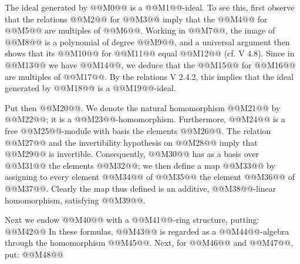 The ideal generated by @@M0@@ is a @@M1@@-ideal. To see this, first observe that the relations @@M2@@ for @@M3@@ imply that the @@M4@@ for @@M5@@ are multiples of @@M6@@. Working in @@M7@@, the image of @@M8@@ is a polynomial of degree @@M9@@, and a universal argument then shows that its @@M10@@ for @@M11@@ equal @@M12@@ (cf. V 4.8). Since in @@M13@@ we have @@M14@@, we deduce that the @@M15@@ for @@M16@@ are multiples of @@M17@@. By the relations V 2.4.2, this implies that the ideal generated by @@M18@@ is a @@M19@@-ideal.

Put then @@M20@@. We denote the natural homomorphism @@M21@@ by @@M22@@; it is a @@M23@@-homomorphism. Furthermore, @@M24@@ is a free @@M25@@-module with basis the elements @@M26@@. The relation @@M27@@ and the invertibility hypothesis on @@M28@@ imply that @@M29@@ is invertible. Consequently, @@M30@@ has as a basis over @@M31@@ the elements @@M32@@; we then define a map @@M33@@ by assigning to every element @@M34@@ of @@M35@@ the element @@M36@@ of @@M37@@. Clearly the map thus defined is an additive, @@M38@@-linear homomorphism, satisfying @@M39@@.

Next we endow @@M40@@ with a @@M41@@-ring structure, putting:
@@M42@@
In these formulas, @@M43@@ is regarded as a @@M44@@-algebra through the homomorphism @@M45@@.
Next, for @@M46@@ and @@M47@@, put:
@@M48@@
